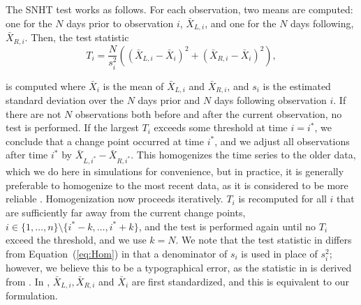 \documentclass[12pt]{article}
\def\ni{\noindent}
\begin{document}
\begin{doublespacing}
The SNHT test works as follows.  For each observation, two means are computed: one for the $N$ days prior to observation $i$, $\bar{X}_{L,i}$, and one for the $N$ days following, $\bar{X}_{R,i}$.  Then, the test statistic
\begin{equation}
	T_i = \frac{N}{s_i^2}\left( (\bar{X}_{L,i}-\bar{X}_i)^2 + (\bar{X}_{R,i}-\bar{X}_i)^2\right),
	\label{eq:Hom}
\end{equation}

\ni is computed where $\bar{X}_i$ is the mean of $\bar{X}_{L,i}$ and $\bar{X}_{R,i}$, and $s_i$ is the estimated standard deviation over the $N$ days prior and $N$ days following observation $i$.  If there are not $N$ observations both before and after the current observation, no test is performed.  If the largest $T_i$ exceeds some threshold at time $i=i^*$, we conclude that a change point occurred at time $i^*$, and we adjust all observations after time $i^*$ by $\bar{X}_{L,i^*}-\bar{X}_{R,i^*}$. This homogenizes the time series to the older data, which we do here in simulations for convenience, but  in practice, it is generally preferable to homogenize to the most recent data, as it is considered to be more reliable \cite{domonkos13}. %
 Homogenization now proceeds iteratively.  $T_i$ is recomputed for all $i$ that are sufficiently far away from the current change points, $i\in\{1,\ldots,n\} \setminus \{i^*-k, \ldots, i^*+k\}$, and the test is performed again until no $T_i$ exceed the threshold, and we use $k=N$.  
We note that the test statistic in \cite{haimberger07} differs from Equation~(\ref{eq:Hom}) in that a denominator of $s_i$ is used in place of $s_i^2$; however, we believe this to be a typographical error, as the statistic in \cite{haimberger07} is derived from \cite{alexandersson86}.  In \cite{alexandersson86}, $\bar{X}_{L,i}, \bar{X}_{R,i}$ and $\bar{X}_{i}$ are first standardized, and  this is equivalent to our formulation.



\end{doublespacing}
\end{document}
